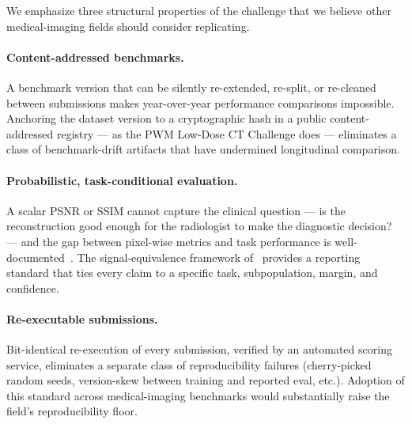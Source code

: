 \documentclass[twoside,11pt]{article}
\begin{document}
We emphasize three structural properties of the challenge that we believe other medical-imaging fields should consider replicating.

\paragraph{Content-addressed benchmarks.} A benchmark version that can be silently re-extended, re-split, or re-cleaned between submissions makes year-over-year performance comparisons impossible. Anchoring the dataset version to a cryptographic hash in a public content-addressed registry --- as the PWM Low-Dose CT Challenge does --- eliminates a class of benchmark-drift artifacts that have undermined longitudinal comparison.

\paragraph{Probabilistic, task-conditional evaluation.} A scalar PSNR or SSIM cannot capture the clinical question --- is the reconstruction good enough for the radiologist to make the diagnostic decision? --- and the gap between pixel-wise metrics and task performance is well-documented~\citep{kim2019smoothing}. The signal-equivalence framework of~\citep{ws2framework} provides a reporting standard that ties every claim to a specific task, subpopulation, margin, and confidence.

\paragraph{Re-executable submissions.} Bit-identical re-execution of every submission, verified by an automated scoring service, eliminates a separate class of reproducibility failures (cherry-picked random seeds, version-skew between training and reported eval, etc.). Adoption of this standard across medical-imaging benchmarks would substantially raise the field's reproducibility floor.
\end{document}
